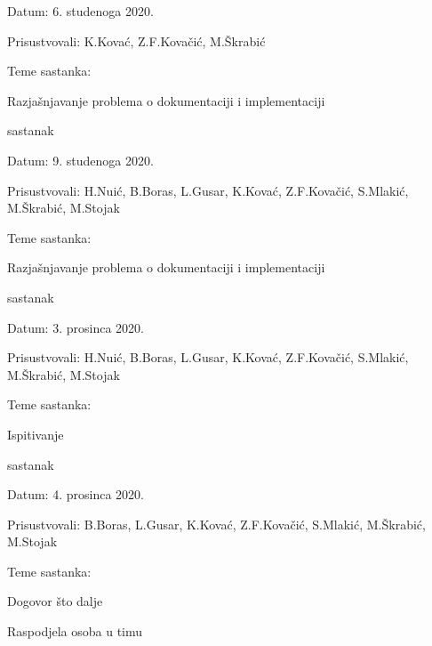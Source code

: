 \begin{packed_enum}
			\item[] \begin{packed_item}
				\item Datum:  6. studenoga 2020.
				\item Prisustvovali: K.Kovać, Z.F.Kovačić, M.Škrabić
				\item Teme sastanka:
				\begin{packed_item}
					\item  Razjašnjavanje problema o dokumentaciji i implementaciji\\
				\end{packed_item}
			\end{packed_item}
			
			\item  sastanak
			
			\item[] \begin{packed_item}
				\item Datum:  9. studenoga 2020.
				\item Prisustvovali: H.Nuić, B.Boras, L.Gusar, K.Kovać, Z.F.Kovačić, S.Mlakić, M.Škrabić, M.Stojak
				\item Teme sastanka: 
				\begin{packed_item}
					\item  Razjašnjavanje problema o dokumentaciji i implementaciji\\ 
				\end{packed_item}
			\end{packed_item}
			
			\item sastanak
			
			\item[] \begin{packed_item}
				\item Datum:  3. prosinca 2020.
				\item Prisustvovali: H.Nuić, B.Boras, L.Gusar, K.Kovać, Z.F.Kovačić, S.Mlakić, M.Škrabić, M.Stojak
				\item Teme sastanka:
				\begin{packed_item}
					\item  Ispitivanje\\
				\end{packed_item}
			\end{packed_item}
		
			\item sastanak
			
			\item[] \begin{packed_item}
				\item Datum:  4. prosinca 2020.
				\item Prisustvovali: B.Boras, L.Gusar, K.Kovać, Z.F.Kovačić, S.Mlakić, M.Škrabić, M.Stojak
				\item Teme sastanka:
				\begin{packed_item}
					\item  Dogovor što dalje
					\item  Raspodjela osoba u timu\\
				\end{packed_item}
			\end{packed_item}
			

\end{packed_enum}
